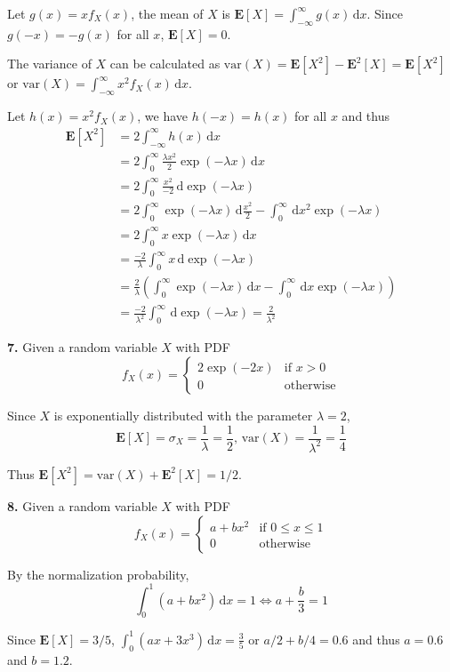 \documentclass[a4paper,12pt]{article}
\newcommand{\E}{\mathbf E}
\newcommand{\ud}{\,\mathrm{d}}
\newcommand{\var}{\mathrm{var}}
\newcommand{\exercise}[1]{\noindent\textbf{#1.}}
\begin{document}
Let $g(x) = x f_X(x)$, the mean of $X$ is
$\E[X] = \displaystyle\int_{-\infty}^\infty g(x)\ud x$.  Since $g(-x) = -g(x)$
for all $x$, $\E[X] = 0$.

The variance of $X$ can be calculated as
$\var(X) = \E\left[X^2\right] - \E^2[X] = \E\left[X^2\right]$
or $\var(X) = \displaystyle\int_{-\infty}^\infty x^2 f_X(x)\ud x$.

Let $h(x) = x^2 f_X(x)$, we have $h(-x) = h(x)$ for all $x$ and thus
\begin{align*}
  \E\left[X^2\right] &= 2\int_{-\infty}^\infty h(x)\ud x\\
  &= 2\int_0^\infty\frac{\lambda x^2}{2}\exp(-\lambda x)\ud x\\
  &= 2\int_0^\infty\frac{x^2}{-2}\ud\exp(-\lambda x)\\
  &= 2\int_0^\infty\exp(-\lambda x)\ud\frac{x^2}{2}
   - \int_0^\infty\ud x^2\exp(-\lambda x)\\
  &= 2\int_0^\infty x\exp(-\lambda x)\ud x\\
  &= \frac{-2}{\lambda}\int_0^\infty x\ud\exp(-\lambda x)\\
  &= \frac{2}{\lambda}\left(\int_0^\infty\exp(-\lambda x)\ud x
   - \int_0^\infty\ud x\exp(-\lambda x)\right)\\
  &= \frac{-2}{\lambda^2}\int_0^\infty\ud\exp(-\lambda x)
   = \frac{2}{\lambda^2}
\end{align*}

\exercise 7  Given a random variable $X$ with PDF
\[f_X(x) = \begin{cases}
  2\exp(-2 x) &\text{if }x > 0\\
  0 &\text{otherwise}
\end{cases}\]

Since $X$ is exponentially distributed with the parameter $\lambda = 2$,
\[\E[X] = \sigma_X = \frac{1}{\lambda} = \frac{1}{2},\,
\var(X) = \frac{1}{\lambda^2} = \frac{1}{4}\]

Thus $\E\left[X^2\right] = \var(X) + \E^2[X] = 1/2$.

\exercise 8  Given a random variable $X$ with PDF
\[f_X(x) = \begin{cases}
  a + bx^2 &\text{if }0 \le x \le 1\\
  0 &\text{otherwise}
\end{cases}\]

By the normalization probability,
\[\int_0^1\left(a + bx^2\right)\ud x = 1 \iff a + \frac{b}{3} = 1\]

Since $\E[X] = 3/5$,
$\displaystyle\int_0^1\left(ax + 3x^3\right)\ud x = \frac{3}{5}$
or $a/2 + b/4 = 0.6$
and thus $a = 0.6$ and $b = 1.2$.
\end{document}
